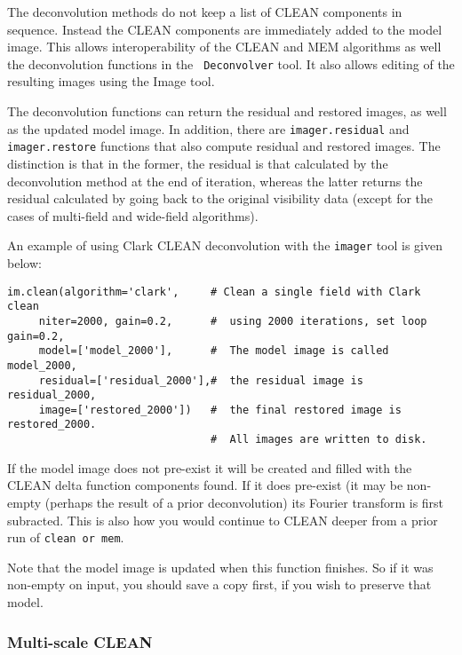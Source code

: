 The deconvolution methods do not keep a list of CLEAN components in
sequence.  Instead the CLEAN components are immediately added to the
model image.  This allows interoperability of the CLEAN and MEM
algorithms as well the deconvolution functions in the {\tt
Deconvolver} tool.  It also allows editing of the resulting images
using the Image tool.

The deconvolution functions can return the residual and restored
images, as well as the updated model image. In addition, there are
{\tt imager.residual} and {\tt imager.restore} functions that also
compute residual and restored images. The distinction is that in the
former, the residual is that calculated by the deconvolution method at
the end of iteration, whereas the latter returns the residual
calculated by going back to the original visibility data (except for
the cases of multi-field and wide-field algorithms).

An example of using Clark CLEAN deconvolution with the {\tt imager}
tool is given below:

\small
\begin{verbatim}
im.clean(algorithm='clark',     # Clean a single field with Clark clean
     niter=2000, gain=0.2,      #  using 2000 iterations, set loop gain=0.2,
     model=['model_2000'],      #  The model image is called model_2000,
     residual=['residual_2000'],#  the residual image is residual_2000,
     image=['restored_2000'])   #  the final restored image is restored_2000.
                                #  All images are written to disk.
\end{verbatim}
\normalsize

If the model image does not pre-exist it will be created and filled
with the CLEAN delta function components found.  If it does pre-exist
(it may be non-empty (perhaps the result of a prior deconvolution) its
Fourier transform is first subracted.  This is also how you would
continue to CLEAN deeper from a prior run of {\tt clean or mem}.

Note that the model image is updated when this function finishes.
So if it was non-empty on input, you should save a copy first,
if you wish to preserve that model.

\subsubsection{Multi-scale CLEAN}
\label{subsubsection:synth.im.msClean}

